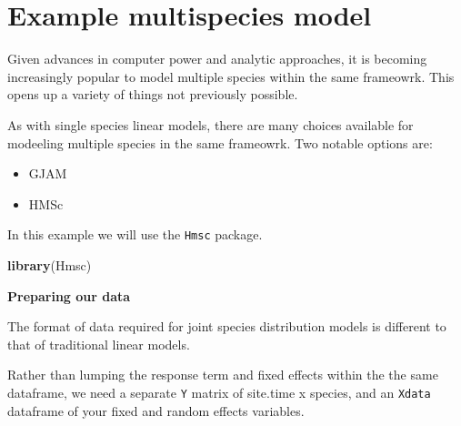 \documentclass[]{book}
\newenvironment{Shaded}{\begin{snugshade}}{\end{snugshade}}
\newcommand{\KeywordTok}[1]{\textcolor[rgb]{0.13,0.29,0.53}{\textbf{#1}}}
\newcommand{\DataTypeTok}[1]{\textcolor[rgb]{0.13,0.29,0.53}{#1}}
\newcommand{\DecValTok}[1]{\textcolor[rgb]{0.00,0.00,0.81}{#1}}
\newcommand{\StringTok}[1]{\textcolor[rgb]{0.31,0.60,0.02}{#1}}
\newcommand{\CommentTok}[1]{\textcolor[rgb]{0.56,0.35,0.01}{\textit{#1}}}
\newcommand{\OperatorTok}[1]{\textcolor[rgb]{0.81,0.36,0.00}{\textbf{#1}}}
\newcommand{\NormalTok}[1]{#1}
\providecommand{\tightlist}{%
  \setlength{\itemsep}{0pt}\setlength{\parskip}{0pt}}
\begin{document}
\section{Example multispecies model}\label{example-multispecies-model}

Given advances in computer power and analytic approaches, it is becoming
increasingly popular to model multiple species within the same
frameowrk. This opens up a variety of things not previously possible.

As with single species linear models, there are many choices available
for modeeling multiple species in the same frameowrk. Two notable
options are:

\begin{itemize}
\tightlist
\item
  GJAM
\item
  HMSc
\end{itemize}

In this example we will use the \texttt{Hmsc} package.

\begin{Shaded}
\begin{Highlighting}[]
\KeywordTok{library}\NormalTok{(Hmsc)}
\end{Highlighting}
\end{Shaded}

\textbf{Preparing our data}

The format of data required for joint species distribution models is
different to that of traditional linear models.

Rather than lumping the response term and fixed effects within the the
same dataframe, we need a separate \texttt{Y} matrix of site.time x
species, and an \texttt{Xdata} dataframe of your fixed and random
effects variables.

\begin{Shaded}
\end{Shaded}
\end{document}
